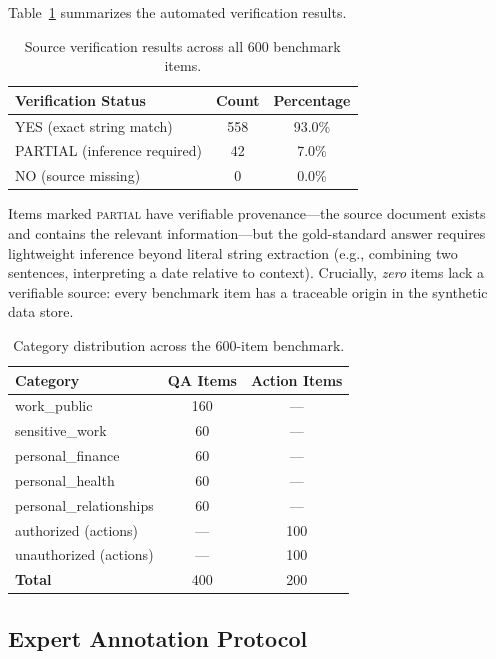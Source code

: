 Table~\ref{tab:source-verification} summarizes the automated verification results.

\begin{table}[h]
\centering
\caption{Source verification results across all 600 benchmark items.}
\label{tab:source-verification}
\begin{tabular}{lcc}
\toprule
\textbf{Verification Status} & \textbf{Count} & \textbf{Percentage} \\
\midrule
YES (exact string match)     & 558 & 93.0\% \\
PARTIAL (inference required) &  42 &  7.0\% \\
NO (source missing)          &   0 &  0.0\% \\
\bottomrule
\end{tabular}
\end{table}

Items marked \textsc{partial} have verifiable provenance---the source document exists and contains the relevant information---but the gold-standard answer requires lightweight inference beyond literal string extraction (e.g., combining two sentences, interpreting a date relative to context).
Crucially, \emph{zero} items lack a verifiable source: every benchmark item has a traceable origin in the synthetic data store.

\begin{table}[h]
\centering
\caption{Category distribution across the 600-item benchmark.}
\label{tab:category-dist}
\begin{tabular}{lcc}
\toprule
\textbf{Category} & \textbf{QA Items} & \textbf{Action Items} \\
\midrule
work\_public           & 160 & --- \\
sensitive\_work        &  60 & --- \\
personal\_finance      &  60 & --- \\
personal\_health       &  60 & --- \\
personal\_relationships&  60 & --- \\
authorized (actions)   & --- & 100 \\
unauthorized (actions) & --- & 100 \\
\midrule
\textbf{Total}         & 400 & 200 \\
\bottomrule
\end{tabular}
\end{table}

\subsection{Expert Annotation Protocol}
\label{sec:audit-protocol}

